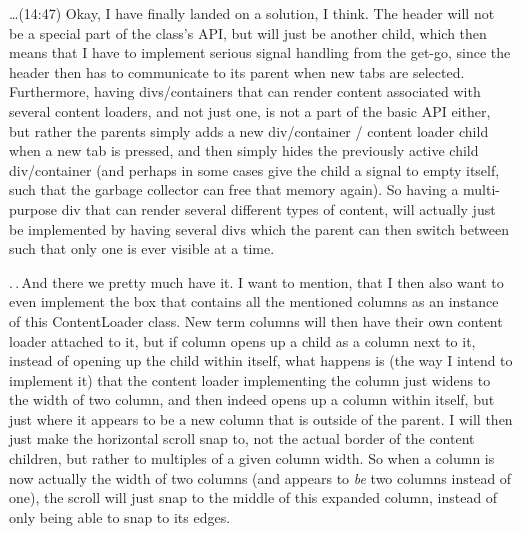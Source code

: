 \documentclass{report}
\begin{document}
\ldots (14:47) Okay, I have finally landed on a solution, I think. The header will not be a special part of the class's API, but will just be another child, which then means that I have to implement serious signal handling from the get-go, since the header then has to communicate to its parent when new tabs are selected. Furthermore, having divs/containers that can render content associated with several content loaders, and not just one, is not a part of the basic API either, but rather the parents simply adds a new div/container / content loader child when a new tab is pressed, and then simply hides the previously active child div/container (and perhaps in some cases give the child a signal to empty itself, such that the garbage collector can free that memory again). So having a multi-purpose div that can render several different types of content, will actually just be implemented by having several divs which the parent can then switch between such that only one is ever visible at a time. 

.\,.\,And there we pretty much have it. I want to mention, that I then also want to even implement the box that contains all the mentioned columns as an instance of this ContentLoader class. New term columns will then have their own content loader attached to it, but if column opens up a child as a column next to it, instead of opening up the child within itself, what happens is (the way I intend to implement it) that the content loader implementing the column just widens to the width of two column, and then indeed opens up a column within itself, but just where it appears to be a new column that is outside of the parent. I will then just make the horizontal scroll snap to, not the actual border of the content children, but rather to multiples of a given column width. So when a column is now actually the width of two columns (and appears to \emph{be} two columns instead of one), the scroll will just snap to the middle of this expanded column, instead of only being able to snap to its edges. %
\end{document}
